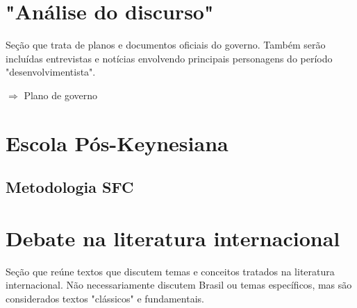 \documentclass[12pt]{report}
\begin{document}







\section{"Análise do discurso"}

Seção que trata de planos e documentos oficiais do governo. Também serão incluídas entrevistas e notícias envolvendo principais personagens do período "desenvolvimentista".

 $\Rightarrow$ Plano de governo


\section{Escola Pós-Keynesiana}









\subsection{Metodologia SFC}






\section{Debate na literatura internacional}

Seção que reúne textos que discutem temas e conceitos tratados na literatura internacional. Não necessariamente discutem Brasil ou temas específicos, mas são considerados textos "clássicos" e fundamentais.
\end{document}
